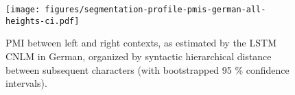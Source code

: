 \begin{figure}
  \center
\texttt{[image: figures/segmentation-profile-pmis-german-all-heights-ci.pdf]}
\caption{PMI between left and right contexts, as estimated by the LSTM CNLM in German, organized by syntactic hierarchical distance between subsequent characters (with bootstrapped 95 \% confidence intervals).}\label{fig:syntax-depth}
\end{figure}








%
%
%
